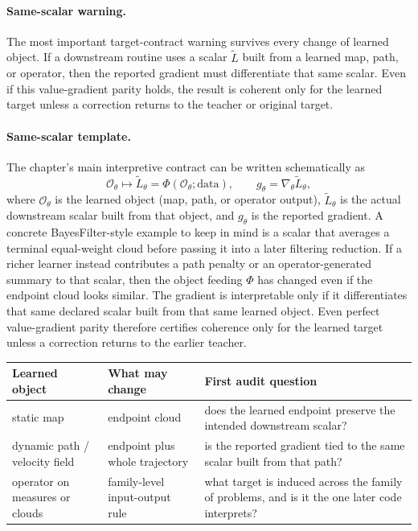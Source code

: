 \paragraph{Same-scalar warning.}
The most important target-contract warning survives every change of learned
object.  If a downstream routine uses a scalar \(\widetilde L\) built from a
learned map, path, or operator, then the reported gradient must differentiate that
same scalar.  Even if this value-gradient parity holds, the result is coherent
only for the learned target unless a correction returns to the teacher or original
target.

\paragraph{Same-scalar template.}
The chapter's main interpretive contract can be written schematically as
\begin{equation}
\label{eq:bf-neural-ot-dynamic-same-scalar-template}
  \mathcal O_\theta
  \longmapsto
  \widetilde L_\theta
  =
  \Phi(\mathcal O_\theta;\text{data}),
  \qquad
  g_\theta = \nabla_\theta \widetilde L_\theta,
\end{equation}
where \(\mathcal O_\theta\) is the learned object (map, path, or operator output),
\(\widetilde L_\theta\) is the actual downstream scalar built from that object,
and \(g_\theta\) is the reported gradient.  A concrete BayesFilter-style example to
keep in mind is a scalar that averages a terminal equal-weight cloud before passing
it into a later filtering reduction.  If a richer learner instead contributes a path
penalty or an operator-generated summary to that scalar, then the object feeding
\(\Phi\) has changed even if the endpoint cloud looks similar.  The gradient is
interpretable only if it differentiates that same declared scalar built from that
same learned object.  Even perfect value-gradient parity therefore certifies
coherence only for the learned target unless a correction returns to the earlier
teacher.

\begin{center}
\small
\begin{tabular}{p{} p{} p{}}
\toprule
Learned object & What may change & First audit question \\
\midrule
static map & endpoint cloud & does the learned endpoint preserve the intended downstream scalar? \\
dynamic path / velocity field & endpoint plus whole trajectory & is the reported gradient tied to the same scalar built from that path? \\
operator on measures or clouds & family-level input-output rule & what target is induced across the family of problems, and is it the one later code interprets? \\
\bottomrule
\end{tabular}
\end{center}

